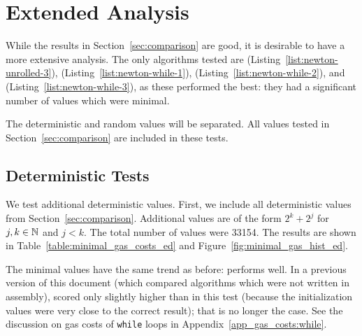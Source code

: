 \section{Extended Analysis}
\label{app:extended}

While the results in Section~\ref{sec:comparison} are good,
it is desirable to have a more extensive analysis.
The only algorithms tested are
\UnrolledThree{} (Listing~\ref{list:newton-unrolled-3}),
\WhileOne{} (Listing~\ref{list:newton-while-1}),
\WhileTwo{} (Listing~\ref{list:newton-while-2}), and
\WhileThree{} (Listing~\ref{list:newton-while-3}),
as these performed the best:
they had a significant number of values which were minimal.

The deterministic and random values will be separated.
All values tested in Section~\ref{sec:comparison}
are included in these tests.

\subsection{Deterministic Tests}
\label{app:deterministic}

We test additional deterministic values.
First, we include all deterministic values from Section~\ref{sec:comparison}.
Additional values are of the form $2^{k} + 2^{j}$ for $j,k\in\mathbb{N}$ and $j < k$.
The total number of values were \num{33154}.
The results are shown in Table~\ref{table:minimal_gas_costs_ed}
and Figure~\ref{fig:minimal_gas_hist_ed}.

The minimal values have the same trend as before:
\UnrolledThree{} performs well.
In a previous version of this document
(which compared algorithms which were not written in assembly),
\UnrolledThree{} scored only slightly higher than \WhileOne{} in this test
(because the \WhileOne{} initialization values
were very close to the correct result);
that is no longer the case.
See the discussion on gas costs of \texttt{while} loops
in Appendix~\ref{app_gas_costs:while}.

\begin{figure}[p]
\begin{minipage}{\textwidth}

\end{minipage}

\vspace{1cm}

\begin{minipage}{\textwidth}

\end{minipage}
\end{figure}


